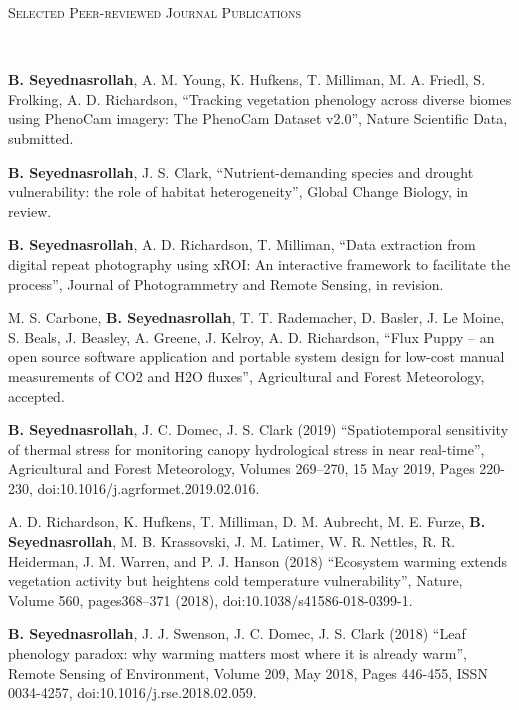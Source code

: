 \documentclass[10pt]{article}
\newenvironment{changemargin}[2]{%
  \begin{list}{}{%
    \setlength{\topsep}{0pt}%
    \setlength{\leftmargin}{#1}%
    \setlength{\rightmargin}{#2}%
    \setlength{\listparindent}{\parindent}%
    \setlength{\itemindent}{\parindent}%
    \setlength{\parsep}{\parskip}%
  }%
  \item[]}{\end{list}
}
\newcommand{\lineover}{
	\begin{changemargin}{-0.05in}{-0.05in}
		\vspace*{-8pt}
		\hrulefill \\
		\vspace*{-2pt}
	\end{changemargin}
}
\newcommand{\header}[1]{
	\begin{changemargin}{-0.5in}{-0.5in}
		\scshape{#1}\\
  	\lineover
	\end{changemargin}
}
\newenvironment{body} {
	\vspace*{-2pt}
	\begin{changemargin}{-0.5in}{-0.5in}
  }
	{\end{changemargin}
}
\begin{document}
\medskip
\header{Selected Peer-reviewed Journal Publications}

\begin{body}
\medskip


\textbf{B. Seyednasrollah}, A. M. Young, K. Hufkens, T. Milliman, M. A. Friedl, S. Frolking, A. D. Richardson, ``Tracking vegetation phenology across diverse biomes using PhenoCam imagery: The PhenoCam Dataset v2.0'', Nature Scientific Data, submitted.\\
\medskip

	\textbf{B. Seyednasrollah}, J. S. Clark, ``Nutrient-demanding species and drought vulnerability: the role of habitat heterogeneity'', Global Change Biology, in review.\\
\medskip

	\textbf{B. Seyednasrollah}, A. D. Richardson, T. Milliman, ``Data extraction from digital repeat photography using xROI: An interactive framework to facilitate the process'', Journal of Photogrammetry and Remote Sensing, in revision.\\
\medskip

M. S. Carbone, \textbf{B. Seyednasrollah}, T. T. Rademacher, D. Basler, J. Le Moine, S. Beals, J. Beasley, A. Greene, J. Kelroy, A. D. Richardson, ``Flux Puppy – an open source software application and portable system design for low-cost manual measurements of CO2 and H2O fluxes'', Agricultural and Forest Meteorology, accepted.\\
\medskip


	\textbf{B. Seyednasrollah}, J. C. Domec, J. S. Clark (2019) ``Spatiotemporal sensitivity of thermal stress for monitoring canopy hydrological stress in near real-time'', Agricultural and Forest Meteorology, Volumes 269–270, 15 May 2019, Pages 220-230, doi:10.1016/j.agrformet.2019.02.016.\\
\medskip


	A. D. Richardson, K. Hufkens, T. Milliman, D. M. Aubrecht, M. E. Furze, \textbf{B. Seyednasrollah}, M. B. Krassovski, J. M. Latimer, W. R. Nettles, R. R. Heiderman, J. M. Warren, and P. J. Hanson (2018) ``Ecosystem warming extends vegetation activity but heightens cold temperature vulnerability'', Nature, Volume 560, pages368–371 (2018), doi:10.1038/s41586-018-0399-1.\\
\medskip

	\textbf{B. Seyednasrollah}, J. J. Swenson, J. C. Domec, J. S. Clark (2018) ``Leaf phenology paradox: why warming matters most where it is already warm'', Remote Sensing of Environment, Volume 209, May 2018, Pages 446-455, ISSN 0034-4257, doi:10.1016/j.rse.2018.02.059.\\
\medskip


\end{body}
\end{document}
